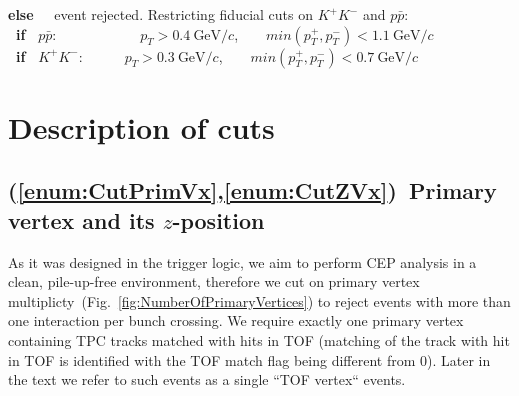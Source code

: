 \begin{enumerate}[label=\textbf{C\arabic*},ref=C\arabic*]
\begin{enumerate}[label=\textbf{\theenumi.\arabic*},ref=\theenumi.\arabic*]
        \textbf{else~~} event rejected.
      \itemm Restricting fiducial cuts on $K^{+}K^{-}$ and $p\bar{p}$:\\[2pt]
      \textbf{~if~} $p\bar{p}$:~~~~~~~~~~~~\hspace*{1.7pt}$p_{T}>0.4~\text{GeV}/c$,~~~~$min(p_{T}^{+},p_{T}^{-})<1.1~\text{GeV}/c$\\%
      \textbf{~if~} $K^{+}K^{-}$:~~~~~~$p_{T}>0.3~\text{GeV}/c$,~~~~$min(p_{T}^{+},p_{T}^{-})<0.7~\text{GeV}/c$\\%
        
\end{enumerate}
\end{enumerate}

\section{Description of cuts}\label{sec:descriptionOfCuts}
\subsection{(\ref{enum:CutPrimVx},\ref{enum:CutZVx})~Primary vertex and its \texorpdfstring{$z$}{z}-position}
As it was designed in the trigger logic, we aim to perform CEP analysis in a clean, pile-up-free environment, therefore we cut on primary vertex multiplicty~(Fig.~\ref{fig:NumberOfPrimaryVertices}) to reject events with more than one interaction per bunch crossing. We require exactly one primary vertex containing TPC tracks matched with hits in TOF (matching of the track with hit in TOF is identified with the TOF match flag being different from 0). Later in the text we refer to such events as a single ``TOF vertex`` events.

